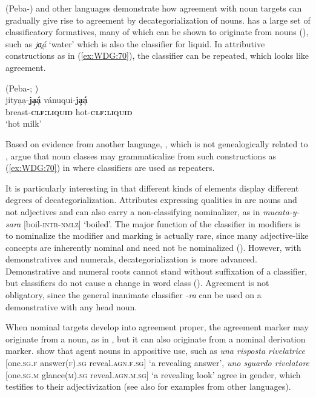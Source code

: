 \documentclass[output=collectionpaper]{langsci/langscibook}
\begin{document}
 (Peba-) and other  languages demonstrate how agreement with noun targets can gradually give rise to agreement by decategorialization of nouns.  has a large set of classificatory formatives, many of which can be shown to originate from nouns (\citealt[120]{Payne1986}), such as \textit{ja̧á̦} `water' which is also the classifier for liquid. In attributive constructions as in (\ref{ex:WDG:70}), the classifier can be repeated, which looks like agreement.

\ea\label{ex:WDG:70}
 (Peba-; \citealt[126]{Payne1986})\\
\gll jitya̦a̦-\textbf{ja̧á̦}	vánuqui-\textbf{ja̧á̦}\\
breast-\textbf{\textsc{clf:liquid}}	hot-\textbf{\textsc{clf:liquid}}\\
\glt `hot milk'\\
\z

Based on evidence from another  language, , which is not genealogically related to , \cite[278--279]{Grinevald2004} argue that noun classes may grammaticalize from such constructions as (\ref{ex:WDG:70}) in  where classifiers are used as repeaters.

It is particularly interesting in  that different kinds of elements display different degrees of decategorialization. Attributes expressing qualities in  are nouns and not adjectives and can also carry a non-classifying nominalizer, as in \textit{mucata-y-sara} [boil-\textsc{intr-nmlz}] `boiled'. The major function of the classifier in modifiers is to nominalize the modifier and marking is actually rare, since many adjective-like concepts are inherently nominal and need not be nominalized (\citealt[127]{Payne1986}). However, with demonstratives and numerals, decategorialization is more advanced. Demonstrative and numeral roots cannot stand without suffixation of a classifier, but classifiers do not cause a change in word class (\citealt[127]{Payne1986}). Agreement is not obligatory, since the general inanimate classifier \textit{-ra} can be used on a demonstrative with any head noun.

When nominal targets develop into agreement proper, the agreement marker may originate from a noun, as in , but it can also originate from a nominal derivation marker. \cite{Dressler1990} show that  agent nouns in appositive use, such as \textit{una risposta rivelatrice} [one.\textsc{sg.f} answer\textsc{(f).sg} reveal.\textsc{agn.f.sg}] `a revealing answer', \textit{uno sguardo rivelatore} [one.\textsc{sg.m} glance\textsc{(m).sg} reveal.\textsc{agn.m.sg}] `a revealing look' agree in gender, which testifies to their adjectivization (see also \citealt[75--76]{Luraghi2015} for examples from other  languages).
\end{document}
